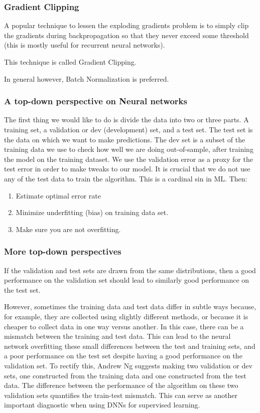 \documentclass{beamer}
\begin{document}
\begin{frame}
\frametitle{Gradient Clipping}

A popular technique to lessen the exploding gradients problem is to
simply clip the gradients during backpropagation so that they never
exceed some threshold (this is mostly useful for recurrent neural
networks).

This technique is called Gradient Clipping.

In general however, Batch
Normalization is preferred.
\end{frame}

\begin{frame}
\frametitle{A top-down perspective on Neural networks}

The first thing we would like to do is divide the data into two or
three parts. A training set, a validation or dev (development) set,
and a test set. The test set is the data on which we want to make
predictions. The dev set is a subset of the training data we use to
check how well we are doing out-of-sample, after training the model on
the training dataset. We use the validation error as a proxy for the
test error in order to make tweaks to our model. It is crucial that we
do not use any of the test data to train the algorithm. This is a
cardinal sin in ML. Then:

\begin{enumerate}
\item Estimate optimal error rate

\item Minimize underfitting (bias) on training data set.

\item Make sure you are not overfitting.
\end{enumerate}

\noindent
\end{frame}

\begin{frame}
\frametitle{More top-down perspectives}

If the validation and test sets are drawn from the same distributions,
then a good performance on the validation set should lead to similarly
good performance on the test set. 

However, sometimes
the training data and test data differ in subtle ways because, for
example, they are collected using slightly different methods, or
because it is cheaper to collect data in one way versus another. In
this case, there can be a mismatch between the training and test
data. This can lead to the neural network overfitting these small
differences between the test and training sets, and a poor performance
on the test set despite having a good performance on the validation
set. To rectify this, Andrew Ng suggests making two validation or dev
sets, one constructed from the training data and one constructed from
the test data. The difference between the performance of the algorithm
on these two validation sets quantifies the train-test mismatch. This
can serve as another important diagnostic when using DNNs for
supervised learning.
\end{frame}
\end{document}
